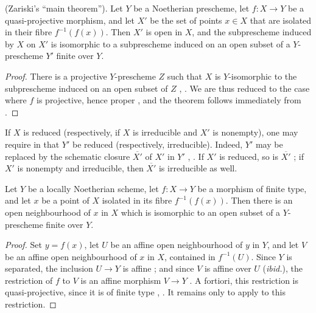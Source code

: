 \begin{theorem}[4.4.3]
\label{III.4.4.3}
\textnormal{(Zariski's ``main theorem'').}
Let $Y$ be a Noetherian prescheme, let $f:X\to Y$ be a
quasi-projective morphism, and let $X'$ be the set of points $x\in X$
that are isolated in their fibre $f^{-1}(f(x))$.  Then $X'$ is open
in $X$, and the subprescheme induced by $X$ on $X'$ is isomorphic to
a subprescheme induced on an open subset of a $Y$-prescheme $Y'$
finite over $Y$.
\end{theorem}

\begin{proof}
There is a projective $Y$-prescheme $Z$ such that $X$ is
$Y$-isomorphic to the subprescheme induced on an open subset of $Z$
, .  We are thus reduced to
the case where $f$ is projective, hence proper
, and the theorem follows immediately from
.
\end{proof}

\begin{remark}[4.4.4]
\label{III.4.4.4}
If $X$ is reduced (respectively, if $X$ is irreducible and $X'$ is
nonempty), one may require in  that $Y'$ be reduced
(respectively, irreducible).  Indeed, $Y'$ may be replaced by the
schematic closure $\overline{X'}$ of $X'$ in $Y'$
, .  If $X'$ is reduced, so is
$\overline{X'}$ ; if $X'$ is nonempty and
irreducible, then $\overline{X'}$ is irreducible as well.
\end{remark}

\begin{corollary}[4.4.5]
\label{III.4.4.5}
Let $Y$ be a locally Noetherian scheme, let $f:X\to Y$ be a morphism
of finite type, and let $x$ be a point of $X$ isolated in its fibre
$f^{-1}(f(x))$.  Then there is an open neighbourhood of $x$ in $X$
which is isomorphic to an open subset of a $Y$-prescheme finite over
$Y$.
\end{corollary}

\begin{proof}
Set $y=f(x)$, let $U$ be an affine open neighbourhood of $y$ in $Y$,
and let $V$ be an affine open neighbourhood of $x$ in $X$, contained
in $f^{-1}(U)$.  Since $Y$ is separated, the inclusion $U\to Y$ is
affine ; and since $V$ is affine over $U$
(\emph{ibid.}), the restriction of $f$ to $V$ is an affine morphism
$V\to Y$ .  A fortiori, this restriction is
quasi-projective, since it is of finite type
, .  It remains only to apply
 to this restriction.
\end{proof}


